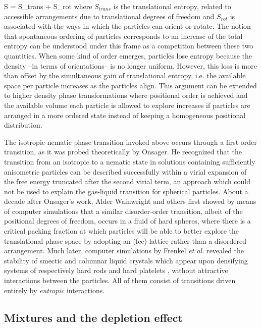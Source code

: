 \beq
S = S_{trans} + S_{rot}
\eeq
where $S_{trans}$ is the translational entropy, related to accessible arrangements due to translational degrees of freedom and $S_{rot}$ is associated with the ways in which the particles can orient or rotate. The notion that spontaneous ordering of particles corresponds to an increase of the total entropy can be understood under this frame as a competition between these two quantities. When some kind of order emerges, particles lose entropy because the density --in terms of orientations-- is no longer uniform. However, this loss is more than offset by the simultaneous gain of translational entropy, i.e.  the available space per particle increases as the particles align. This argument can be extended to higher density phase transformations where positional order is achieved and the available volume each particle is allowed to explore increases if particles are arranged in a more ordered state instead of keeping a homogeneous positional distribution.

The isotropic-nematic phase transition invoked above occurs through a first order transition, as it was probed theoretically by Onsager. He recognized that the transition from an isotropic to a nematic state in solutions containing sufficiently anisometric particles can be described successfully  within a virial expansion of the free energy truncated after the second virial term, an approach which could not be used to explain the gas-liquid transition for spherical particles. About a decade after Onsager's work, Alder Wainwright and others \cite{ALDER57,WOOD57} first showed by means of computer simulations that a similar disorder-order transition, albeit of the positional degrees of freedom, occurs in a fluid of hard spheres, where there is a critical packing fraction at which particles will be able to better explore the translational phase space by adopting an (fcc) lattice rather than a disordered arrangement. Much later, computer simulations by Frenkel {\em et al.}  revealed the stability of smectic and columnar liquid crystals which appear upon densifying systems of respectively hard rods \cite{Frenkel88} and hard platelets \cite{frenkelcol1989,Veerman},  without  attractive interactions between the particles. All of them consist of transitions driven entirely by {\em entropic} interactions.




\subsection{Mixtures and the depletion effect}

